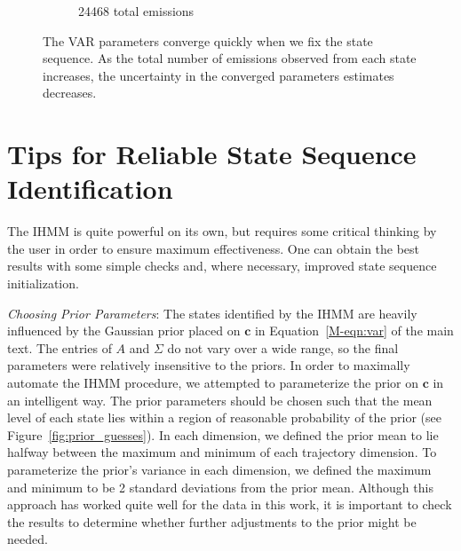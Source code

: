 \documentclass{article}
\begin{document}
\begin{figure}[h]
\begin{subfigure}{0.6\textwidth}
  \caption{24468 total emissions}\label{fig:convergence_MET_high}
  \end{subfigure}
  \caption{The VAR parameters converge quickly when we fix the state
  sequence. As the total number of emissions observed from each state
  increases, the uncertainty in the converged parameters estimates
  decreases.}\label{fig:fixed_state_convergence}
  \end{figure}
  
  \clearpage
    
  \section{Tips for Reliable State Sequence Identification}\label{section:fitting_tips}
  
  The IHMM is quite powerful on its own, but requires some critical thinking by
  the user in order to ensure maximum effectiveness. One can obtain 
  the best results with some simple checks and, where necessary, improved 
  state sequence initialization.  
  
  \textit{Choosing Prior Parameters}: The states identified by the IHMM are 
  heavily influenced by the Gaussian prior placed on $\mathbf{c}$ in 
  Equation~\ref{M-eqn:var} of the main text. The entries of $A$ and $\Sigma$
  do not vary over a wide range, so the final parameters were relatively 
  insensitive to the priors. In order to maximally automate the IHMM procedure,
  we attempted to parameterize the
  prior on $\mathbf{c}$ in an intelligent way. The prior parameters should
  be chosen such that the mean level of each state lies within a region of 
  reasonable probability of the prior (see Figure~\ref{fig:prior_guesses}).
  In each dimension, we defined the prior mean to lie halfway between the 
  maximum and minimum of each trajectory dimension. To parameterize the 
  prior's variance in each dimension, we defined the maximum and minimum to 
  be 2 standard deviations from the prior mean. Although this approach has 
  worked quite well for the data in this work, it is important to check the 
  results to determine whether further adjustments to the prior might be needed.
  
\end{document}
